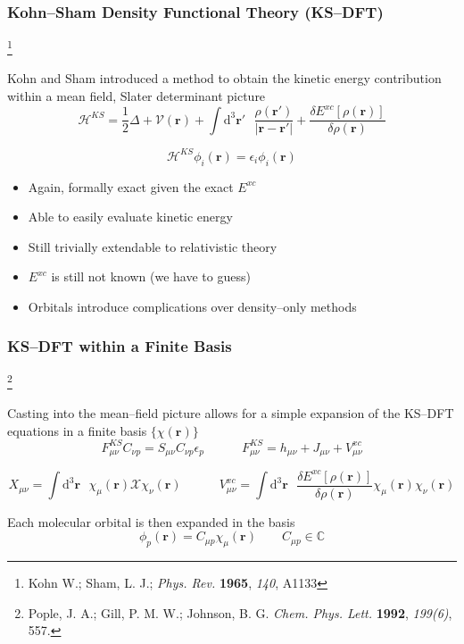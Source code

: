 \documentclass{beamer}
\newcommand\blfootnote[1]{%
  \begingroup
  \renewcommand\thefootnote{}\footnote{#1}%
  \addtocounter{footnote}{-1}%
  \endgroup
}
\begin{document}
\begin{frame}
\frametitle{Kohn--Sham Density Functional Theory (KS--DFT)}
\blfootnote{Kohn W.; Sham, L. J.; \emph{Phys. Rev.} \textbf{1965}, \emph{140}, A1133}

Kohn and Sham introduced a method to obtain the kinetic energy contribution
within a mean field, Slater determinant picture
\begin{equation*}
\mathcal{H}^{KS} = \frac{1}{2}\Delta + \mathcal{V}(\mathbf{r}) + 
  \int \mathrm{d}^3\mathbf{r}'\text{ } \frac{\rho(\mathbf{r}')}{\vert \mathbf{r-r}' \vert} +
  \frac{\delta E^{xc}[\rho(\mathbf{r})]}{\delta \rho(\mathbf{r})}
\end{equation*}

\begin{equation*}
\mathcal{H}^{KS} \phi_i(\mathbf{r}) = \epsilon_i\phi_i(\mathbf{r})
\end{equation*}


\begin{itemize}
  \color{green}
  \item Again, formally exact given the exact $E^{xc}$
  \item Able to easily evaluate kinetic energy
  \item Still trivially extendable to relativistic theory
\end{itemize}

\begin{itemize}
  \color{red}
  \item $E^{xc}$ is still not known (we have to guess)
  \item Orbitals introduce complications over density--only methods
\end{itemize}
\end{frame}

\begin{frame}
\frametitle{KS--DFT within a Finite Basis}
\blfootnote{Pople, J. A.; Gill, P. M. W.; Johnson, B. G. \emph{Chem. Phys. Lett.} \textbf{1992}, \emph{199(6)}, 557.}

Casting into the mean--field picture allows for a simple expansion
of the KS--DFT equations in a finite basis $\{\chi(\mathbf{r})\}$
\begin{equation*}
F_{\mu\nu}^{KS} C_{\nu p} = S_{\mu\nu}C_{\nu p} \epsilon_p \qquad \quad
F_{\mu\nu}^{KS} = h_{\mu\nu} + J_{\mu\nu} + V^{xc}_{\mu\nu}
\end{equation*}

\begin{equation*}
X_{\mu\nu} = \int \mathrm{d}^3\mathbf{r}\text{ } \chi_\mu(\mathbf{r}) \mathcal{X} \chi_\nu(\mathbf{r})
\qquad \quad V^{xc}_{\mu\nu} = \int \mathrm{d}^3\mathbf{r}\text{ } 
  \frac{\delta E^{xc}[\rho(\mathbf{r})]}{\delta \rho(\mathbf{r})}
  \chi_\mu(\mathbf{r}) \chi_\nu(\mathbf{r})
\end{equation*}

Each molecular orbital is then expanded in the basis
\begin{equation*}
\phi_p(\mathbf{r}) = C_{\mu p} \chi_\mu(\mathbf{r}) \qquad C_{\mu p} \in \mathbb{C}
\end{equation*}
\end{frame}
\end{document}
